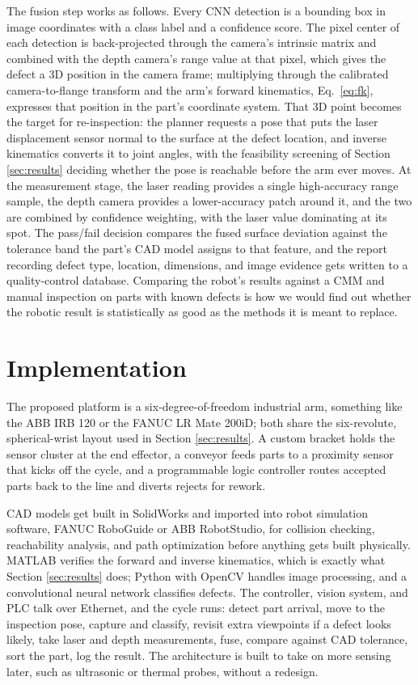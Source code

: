 \documentclass[conference]{IEEEtran}
\begin{document}
The fusion step works as follows. Every CNN detection is a bounding box in image coordinates with a class label and a confidence score. The pixel center of each detection is back-projected through the camera's intrinsic matrix and combined with the depth camera's range value at that pixel, which gives the defect a 3D position in the camera frame; multiplying through the calibrated camera-to-flange transform and the arm's forward kinematics, Eq.~\eqref{eq:fk}, expresses that position in the part's coordinate system. That 3D point becomes the target for re-inspection: the planner requests a pose that puts the laser displacement sensor normal to the surface at the defect location, and inverse kinematics converts it to joint angles, with the feasibility screening of Section \ref{sec:results} deciding whether the pose is reachable before the arm ever moves. At the measurement stage, the laser reading provides a single high-accuracy range sample, the depth camera provides a lower-accuracy patch around it, and the two are combined by confidence weighting, with the laser value dominating at its spot. The pass/fail decision compares the fused surface deviation against the tolerance band the part's CAD model assigns to that feature, and the report recording defect type, location, dimensions, and image evidence gets written to a quality-control database. Comparing the robot's results against a CMM and manual inspection on parts with known defects is how we would find out whether the robotic result is statistically as good as the methods it is meant to replace.

\section{Implementation}
The proposed platform is a six-degree-of-freedom industrial arm, something like the ABB IRB 120 or the FANUC LR Mate 200iD; both share the six-revolute, spherical-wrist layout used in Section \ref{sec:results}. A custom bracket holds the sensor cluster at the end effector, a conveyor feeds parts to a proximity sensor that kicks off the cycle, and a programmable logic controller routes accepted parts back to the line and diverts rejects for rework.

CAD models get built in SolidWorks and imported into robot simulation software, FANUC RoboGuide or ABB RobotStudio, for collision checking, reachability analysis, and path optimization before anything gets built physically. MATLAB verifies the forward and inverse kinematics, which is exactly what Section \ref{sec:results} does; Python with OpenCV handles image processing, and a convolutional neural network classifies defects. The controller, vision system, and PLC talk over Ethernet, and the cycle runs: detect part arrival, move to the inspection pose, capture and classify, revisit extra viewpoints if a defect looks likely, take laser and depth measurements, fuse, compare against CAD tolerance, sort the part, log the result. The architecture is built to take on more sensing later, such as ultrasonic or thermal probes, without a redesign.
\end{document}
